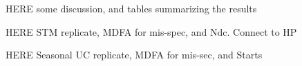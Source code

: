 \documentclass[a4paper]{book}
\begin{document}
   
HERE  some discussion, and tables summarizing the results    
   





% 

 




HERE  STM replicate, MDFA for mis-spec, and Ndc.  Connect to HP
 

HERE  Seasonal UC replicate, MDFA for mis-sec, and Starts
\end{document}
